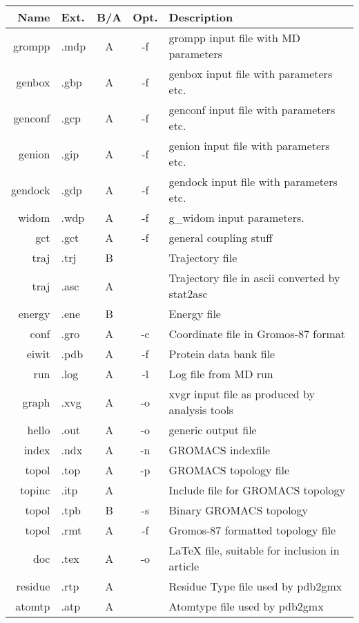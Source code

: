 \begin{table}[p]
\begin{tabularx}{\linewidth}{rlccX}
\hline
    Name &  Ext. & B/A &  Opt. & Description \\
\hline
  grompp &  .mdp &   A &    -f & grompp input file with MD parameters \\
  genbox &  .gbp &   A &    -f & genbox input file with parameters etc. \\
 genconf &  .gcp &   A &    -f & genconf input file with parameters etc. \\
  genion &  .gip &   A &    -f & genion input file with parameters etc. \\
 gendock &  .gdp &   A &    -f & gendock input file with parameters etc. \\
   widom &  .wdp &   A &    -f & g\_widom input parameters. \\
     gct &  .gct &   A &    -f & general coupling stuff \\
    traj &  .trj &   B &       & Trajectory file \\
    traj &  .asc &   A &       & Trajectory file in ascii converted by stat2asc \\
  energy &  .ene &   B &       & Energy file \\
    conf &  .gro &   A &    -c & Coordinate file in Gromos-87 format \\
   eiwit &  .pdb &   A &    -f & Protein data bank file \\
     run &  .log &   A &    -l & Log file from MD run \\
   graph &  .xvg &   A &    -o & xvgr input file as produced by analysis tools \\
   hello &  .out &   A &    -o & generic output file \\
   index &  .ndx &   A &    -n & GROMACS indexfile \\
   topol &  .top &   A &    -p & GROMACS topology file \\
  topinc &  .itp &   A &       & Include file for GROMACS topology \\
   topol &  .tpb &   B &    -s & Binary GROMACS topology \\
   topol &  .rmt &   A &    -f & Gromos-87 formatted topology file \\
     doc &  .tex &   A &    -o & LaTeX file, suitable for inclusion in article \\
 residue &  .rtp &   A &       & Residue Type file used by pdb2gmx \\
  atomtp &  .atp &   A &       & Atomtype file used by pdb2gmx \\

\end{tabularx}
\end{table}
